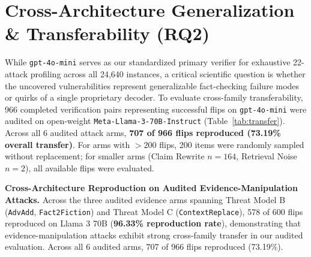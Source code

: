 \documentclass[11pt]{article}
\begin{document}
\section{Cross-Architecture Generalization \& Transferability (RQ2)}
\label{sec:transfer}

While \texttt{gpt-4o-mini} serves as our standardized primary verifier for exhaustive 22-attack profiling across all 24,640 instances, a critical scientific question is whether the uncovered vulnerabilities represent generalizable fact-checking failure modes or quirks of a single proprietary decoder. To evaluate cross-family transferability, 966 completed verification pairs representing successful flips on \texttt{gpt-4o-mini} were audited on open-weight \texttt{Meta-Llama-3-70B-Instruct} (Table~\ref{tab:transfer}). Across all 6 audited attack arms, \textbf{707 of 966 flips reproduced (73.19\% overall transfer)}. For arms with $>200$ flips, 200 items were randomly sampled without replacement; for smaller arms (Claim Rewrite $n=164$, Retrieval Noise $n=2$), all available flips were evaluated.

\begin{table}[!t]
\caption{Cross-model transfer audit on Llama 3 70B Instruct across 966 completed pairs (evaluating flips identified by \texttt{gpt-4o-mini}). Reprod.\ Rate = Confirmed / Audited.}
\label{tab:transfer}
\centering
\begingroup
\renewcommand{\arraystretch}{0.84}
\endgroup
\end{table}

\textbf{Cross-Architecture Reproduction on Audited Evidence-Manipulation Attacks.} Across the three audited evidence arms spanning Threat Model B (\texttt{AdvAdd}, \texttt{Fact2Fiction}) and Threat Model C (\texttt{ContextReplace}), 578 of 600 flips reproduced on Llama 3 70B (\textbf{96.33\% reproduction rate}), demonstrating that evidence-manipulation attacks exhibit strong cross-family transfer in our audited evaluation. Across all 6 audited arms, 707 of 966 flips reproduced (73.19\%).
\end{document}
